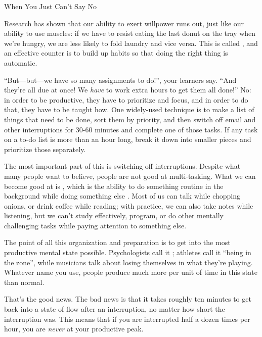 \begin{aside}{When You Just Can't Say No}

Research has shown that our ability to exert willpower runs out,
just like our ability to use muscles: if we have to resist eating
the last donut on the tray when we're hungry, we are less likely to
fold laundry and vice versa. This is called  \cite{Mill2016a}, and an effective
counter is to build up habits so that doing the right thing is
automatic.

\end{aside}

``But---but---we have so many assignments to do!'', your learners say. ``And
they're all due at once! We \emph{have} to work extra hours to get them all
done!'' No: in order to be productive, they have to prioritize and
focus, and in order to do that, they have to be taught how. One
widely-used technique is to make a list of things that need to be done,
sort them by priority, and then switch off email and other interruptions
for 30-60 minutes and complete one of those tasks. If any task on a
to-do list is more than an hour long, break it down into smaller pieces
and prioritize those separately.

The most important part of this is switching off
interruptions. Despite what many people want to believe, people are
not good at multi-tasking. What we can become good at is
, which is the ability to do something
routine in the background while doing something else
\cite{Mill2016a}. Most of us can talk while chopping onions, or
drink coffee while reading; with practice, we can also take notes
while listening, but we can't study effectively, program, or do other
mentally challenging tasks while paying attention to something else.

The point of all this organization and preparation is to get into the
most productive mental state possible. Psychologists call it
 \cite{Csik2008}; athletes call it ``being in the
zone'', while musicians talk about losing themselves in what they're
playing. Whatever name you use, people produce much more per unit of
time in this state than normal.

That's the good news. The bad news is that it takes roughly ten minutes
to get back into a state of flow after an interruption, no matter how
short the interruption was. This means that if you are interrupted half
a dozen times per hour, you are \emph{never} at your productive peak.

